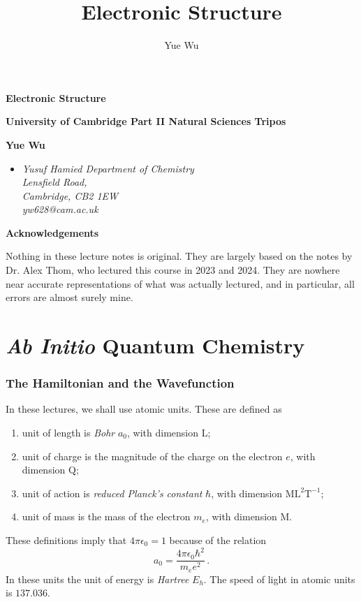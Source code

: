 \documentclass{article}
\title{Electronic Structure}
\author{Yue Wu}
\theoremstyle{plain}\theoremheaderfont{\normalfont\itshape}\theorembodyfont{\rmfamily}\theoremseparator{.}\newtheorem*{rem}{Remark}\newtheorem*{ex}{Example}\newtheorem*{proof}{Proof}\newtheorem*{altp}{Alternative proof}
\theoremstyle{plain}\theoremheaderfont{\normalfont\bfseries}\theorembodyfont{\rmfamily}\theoremseparator{.}\newtheorem{thm}{Theorem}[section]\newtheorem{lem}[thm]{Lemma}\newtheorem{prop}[thm]{Proposition}\newtheorem*{cor}{Corollary}\newtheorem{defn}[thm]{Definition}\newtheorem{clm}[thm]{Claim}\newtheorem{clminproof}{Claim}
\theoremstyle{break}\theoremheaderfont{\normalfont\itshape}\theorembodyfont{\rmfamily}\theoremseparator{.\medskip}\newtheorem*{proofskip}{Proof}\newtheorem*{exs}{Examples}\newtheorem*{rems}{Remarks}
\theoremstyle{break}\theoremheaderfont{\normalfont\bfseries}\theorembodyfont{\rmfamily}\theoremseparator{.\medskip}\newtheorem{lemskip}[thm]{Lemma}\newtheorem{defnskip}[thm]{Definition}\newtheorem{propskip}[thm]{Proposition}\newtheorem{thmskip}[thm]{Theorem}
\numberwithin{equation}{section}
\begin{document}
    \setlength{\parindent}{0pt}
	\Huge\textsf{\textbf{Electronic Structure}}
		
	\Large\textsf{\textbf{University of Cambridge Part II Natural Sciences Tripos}}

	\noindent\makebox[\linewidth]{\rule{\textwidth}{2pt}}

	\large\textsf{\textbf{Yue Wu}}
	\begin{itemize}[topsep=0pt,leftmargin=15pt]
		\item[] \textit{Yusuf Hamied Department of Chemistry\\
		Lensfield Road,\\
		Cambridge, CB2 1EW}\\

		\textit{yw628@cam.ac.uk}
	\end{itemize}
    \thispagestyle{empty}
    \setlength{\parindent}{15pt}

    \newpage
    \begin{center}
		\textbf{\Large{Acknowledgements}}
	\end{center}
	\large
	Nothing in these lecture notes is original. They are largely based on the notes by Dr. Alex Thom, who lectured this course in 2023 and 2024. They are nowhere near accurate representations of what was actually lectured, and in particular, all errors are almost surely mine.

    \normalsize
    \newpage
	\tableofcontents
	\newpage

    \part{\textit{Ab Initio} Quantum Chemistry}
    \section{The Hamiltonian and the Wavefunction}
    In these lectures, we shall use atomic units. These are defined as
    \begin{enumerate}[topsep=0pt,label=(\roman*)]
        \item unit of length is \textit{Bohr} \(a_0\), with dimension \(\mathrm{L}\);
        \item unit of charge is the magnitude of the charge on the electron \(e\), with dimension \(\mathrm{Q}\);
        \item unit of action is \textit{reduced Planck's constant} \(\hbar\), with dimension \(\mathrm{ML^2T^{-1}}\);
        \item unit of mass is the mass of the electron \(m_e\), with dimension \(\mathrm{M}\).
    \end{enumerate}
    These definitions imply that \(4\pi\epsilon_0=1\) because of the relation
    \begin{equation}
        a_0=\frac{4\pi\epsilon_0 \hbar^2}{m_e e^2}\,.
    \end{equation}
    In these units the unit of energy is \textit{Hartree} \(E_h\). The speed of light in atomic units is \(137.036\).
\end{document}

